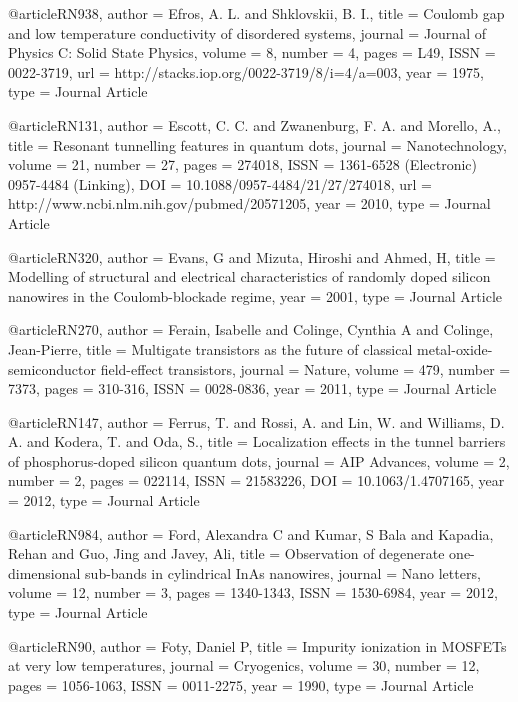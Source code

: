 @article{RN938,
   author = {Efros, A. L. and Shklovskii, B. I.},
   title = {Coulomb gap and low temperature conductivity of disordered systems},
   journal = {Journal of Physics C: Solid State Physics},
   volume = {8},
   number = {4},
   pages = {L49},
   ISSN = {0022-3719},
   url = {http://stacks.iop.org/0022-3719/8/i=4/a=003},
   year = {1975},
   type = {Journal Article}
}

@article{RN131,
   author = {Escott, C. C. and Zwanenburg, F. A. and Morello, A.},
   title = {Resonant tunnelling features in quantum dots},
   journal = {Nanotechnology},
   volume = {21},
   number = {27},
   pages = {274018},
   ISSN = {1361-6528 (Electronic)
0957-4484 (Linking)},
   DOI = {10.1088/0957-4484/21/27/274018},
   url = {http://www.ncbi.nlm.nih.gov/pubmed/20571205},
   year = {2010},
   type = {Journal Article}
}

@article{RN320,
   author = {Evans, G and Mizuta, Hiroshi and Ahmed, H},
   title = {Modelling of structural and electrical characteristics of randomly doped silicon nanowires in the Coulomb-blockade regime},
   year = {2001},
   type = {Journal Article}
}

@article{RN270,
   author = {Ferain, Isabelle and Colinge, Cynthia A and Colinge, Jean-Pierre},
   title = {Multigate transistors as the future of classical metal-oxide-semiconductor field-effect transistors},
   journal = {Nature},
   volume = {479},
   number = {7373},
   pages = {310-316},
   ISSN = {0028-0836},
   year = {2011},
   type = {Journal Article}
}

@article{RN147,
   author = {Ferrus, T. and Rossi, A. and Lin, W. and Williams, D. A. and Kodera, T. and Oda, S.},
   title = {Localization effects in the tunnel barriers of phosphorus-doped silicon quantum dots},
   journal = {AIP Advances},
   volume = {2},
   number = {2},
   pages = {022114},
   ISSN = {21583226},
   DOI = {10.1063/1.4707165},
   year = {2012},
   type = {Journal Article}
}

@article{RN984,
   author = {Ford, Alexandra C and Kumar, S Bala and Kapadia, Rehan and Guo, Jing and Javey, Ali},
   title = {Observation of degenerate one-dimensional sub-bands in cylindrical InAs nanowires},
   journal = {Nano letters},
   volume = {12},
   number = {3},
   pages = {1340-1343},
   ISSN = {1530-6984},
   year = {2012},
   type = {Journal Article}
}

@article{RN90,
   author = {Foty, Daniel P},
   title = {Impurity ionization in MOSFETs at very low temperatures},
   journal = {Cryogenics},
   volume = {30},
   number = {12},
   pages = {1056-1063},
   ISSN = {0011-2275},
   year = {1990},
   type = {Journal Article}
}


